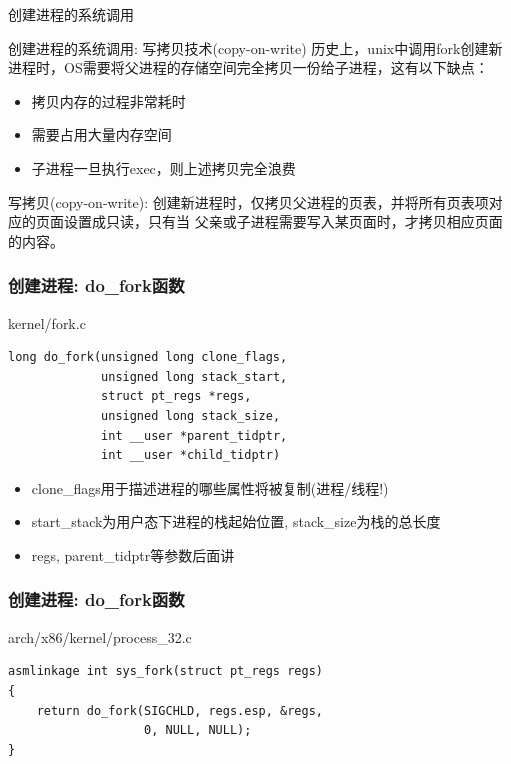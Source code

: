 \documentclass[xcolor=svgnames]{beamer}
\begin{document}
\begin{CJK*}{UTF8}{gbsn}
\begin{frame}{创建进程的系统调用}
\begin{enumerate}
\end{enumerate}
\end{frame}

\begin{frame}{创建进程的系统调用: 写拷贝技术(copy-on-write)}
历史上，unix中调用fork创建新进程时，OS需要将父进程的存储空间完全拷贝一份给子进程，这有以下缺点：
\begin{itemize}
\item 拷贝内存的过程非常耗时
\item 需要占用大量内存空间
\item 子进程一旦执行exec，则上述拷贝完全浪费
\end{itemize}

写拷贝(copy-on-write): 创建新进程时，仅拷贝父进程的页表，并将所有页表项对应的页面设置成只读，只有当
父亲或子进程需要写入某页面时，才拷贝相应页面的内容。
\end{frame}

\begin{frame}[fragile]
\frametitle{创建进程: do\_fork函数}
\begin{block}{kernel/fork.c}
\begin{verbatim}
long do_fork(unsigned long clone_flags,
             unsigned long stack_start,
             struct pt_regs *regs,
             unsigned long stack_size,
             int __user *parent_tidptr,
             int __user *child_tidptr)
\end{verbatim}
\end{block}
\begin{itemize}
\item clone\_flags用于描述进程的哪些属性将被复制(进程/线程!)
\item start\_stack为用户态下进程的栈起始位置, stack\_size为栈的总长度
\item regs, parent\_tidptr等参数后面讲
\end{itemize}
\end{frame}

\begin{frame}[fragile]
\frametitle{创建进程: do\_fork函数}
\begin{block}{arch/x86/kernel/process\_32.c}
\begin{verbatim}
asmlinkage int sys_fork(struct pt_regs regs)
{
    return do_fork(SIGCHLD, regs.esp, &regs, 
                   0, NULL, NULL);
}
\end{verbatim}
\end{block}
\end{frame}


\end{CJK*}
\end{document}
